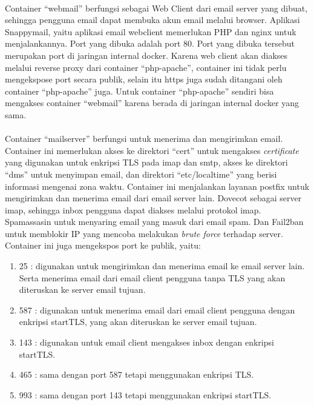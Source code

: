 \documentclass[./bab_3.tex]{subfiles}
\begin{document}
\paragraph*{}Container ``webmail'' berfungsi sebagai Web
Client dari email server yang dibuat, sehingga pengguna
email dapat membuka akun email melalui browser.
Aplikasi Snappymail, yaitu aplikasi email webclient
memerlukan PHP dan nginx untuk menjalankannya. Port yang
dibuka adalah port 80. Port yang dibuka tersebut merupakan
port di jaringan internal docker. Karena web client akan
diakses melalui reverse proxy dari container ``php-apache'',
container ini tidak perlu mengekspose port secara publik,
selain itu https juga sudah ditangani oleh container
``php-apache'' juga. Untuk container ``php-apache'' sendiri bisa
mengakses container ``webmail'' karena berada di jaringan
internal docker yang sama.

\paragraph*{}Container ``mailserver'' berfungsi untuk
menerima dan mengirimkan email. Container ini memerlukan
akses ke direktori ``cert'' untuk mengakses \textit{certificate}
yang digunakan untuk enkripsi TLS pada imap dan smtp, akses
ke direktori ``dms'' untuk menyimpan email, dan direktori
``etc/localtime'' yang berisi informasi mengenai zona waktu.
Container ini menjalankan layanan postfix untuk mengirimkan
dan menerima email dari email server lain. Dovecot sebagai
server imap, sehingga inbox pengguna dapat diakses melalui
protokol imap. Spamassasin untuk menyaring email yang masuk
dari email spam. Dan Fail2ban untuk memblokir IP yang
mencoba melakukan \textit{brute force} terhadap server.
Container ini juga mengekspos port ke publik, yaitu:
\begin{enumerate}
  \item 25 : digunakan untuk mengirimkan dan menerima email
    ke email server lain. Serta menerima email dari email
    client pengguna tanpa TLS yang akan diteruskan ke server
    email tujuan.
  \item 587 : digunakan untuk menerima email dari email
    client pengguna dengan enkripsi startTLS, yang akan
    diteruskan ke server email tujuan.
  \item 143 : digunakan untuk email client mengakses inbox
    dengan enkripsi startTLS.
  \item 465 : sama dengan port 587 tetapi menggunakan
    enkripsi TLS.
  \item 993 : sama dengan port 143 tetapi menggunakan
    enkripsi startTLS.
\end{enumerate}
\end{document}

